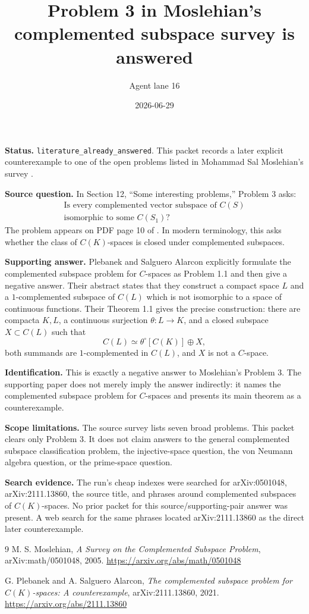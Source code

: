 \documentclass[11pt]{article}
\title{Problem 3 in Moslehian's complemented subspace survey is answered}
\author{Agent lane 16}
\date{2026-06-29}
\begin{document}
\maketitle

\textbf{Status.} \texttt{literature\_already\_answered}.  This packet records a
later explicit counterexample to one of the open problems listed in Mohammad
Sal Moslehian's survey \cite{Moslehian}.

\textbf{Source question.}  In Section 12, ``Some interesting problems,'' Problem
3 asks:
\[
\begin{gathered}
\text{Is every complemented vector subspace of } C(S)\\
\text{isomorphic to some } C(S_1)\text{?}
\end{gathered}
\]
The problem appears on PDF page 10 of \cite{Moslehian}.  In modern terminology,
this asks whether the class of \(C(K)\)-spaces is closed under complemented
subspaces.

\textbf{Supporting answer.}  Plebanek and Salguero Alarcon \cite{PSA} explicitly
formulate the complemented subspace problem for \(C\)-spaces as Problem 1.1 and
then give a negative answer.  Their abstract states that they construct a
compact space \(L\) and a \(1\)-complemented subspace of \(C(L)\) which is not
isomorphic to a space of continuous functions.  Their Theorem 1.1 gives the
precise construction: there are compacta \(K,L\), a continuous surjection
\(\theta:L\to K\), and a closed subspace \(X\subset C(L)\) such that
\[
  C(L)\simeq \theta^\circ[C(K)]\oplus X,
\]
both summands are \(1\)-complemented in \(C(L)\), and \(X\) is not a
\(C\)-space.

\textbf{Identification.}  This is exactly a negative answer to Moslehian's
Problem 3.  The supporting paper does not merely imply the answer indirectly:
it names the complemented subspace problem for \(C\)-spaces and presents its
main theorem as a counterexample.

\textbf{Scope limitations.}  The source survey lists seven broad problems.  This
packet clears only Problem 3.  It does not claim answers to the general
complemented subspace classification problem, the injective-space question, the
von Neumann algebra question, or the prime-space question.

\textbf{Search evidence.}  The run's cheap indexes were searched for
arXiv:0501048, arXiv:2111.13860, the source title, and phrases around
complemented subspaces of \(C(K)\)-spaces.  No prior packet for this
source/supporting-pair answer was present.  A web search for the same phrases
located arXiv:2111.13860 as the direct later counterexample.

\begin{thebibliography}{9}
M. S. Moslehian,
\emph{A Survey on the Complemented Subspace Problem},
arXiv:math/0501048, 2005.
\url{https://arxiv.org/abs/math/0501048}

G. Plebanek and A. Salguero Alarcon,
\emph{The complemented subspace problem for \(C(K)\)-spaces: A counterexample},
arXiv:2111.13860, 2021.
\url{https://arxiv.org/abs/2111.13860}
\end{thebibliography}
\end{document}
